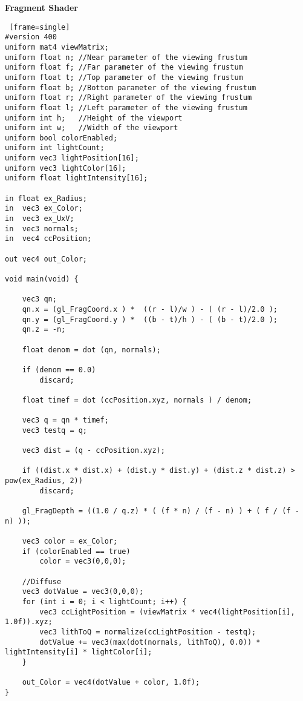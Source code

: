 \textbf{Fragment Shader}
\begin{lstlisting} [frame=single]
#version 400
uniform mat4 viewMatrix;
uniform float n; //Near parameter of the viewing frustum
uniform float f; //Far parameter of the viewing frustum
uniform float t; //Top parameter of the viewing frustum
uniform float b; //Bottom parameter of the viewing frustum
uniform float r; //Right parameter of the viewing frustum
uniform float l; //Left parameter of the viewing frustum
uniform int h; 	 //Height of the viewport
uniform int w; 	 //Width of the viewport
uniform bool colorEnabled;
uniform int lightCount;
uniform vec3 lightPosition[16];
uniform vec3 lightColor[16];
uniform float lightIntensity[16];

in float ex_Radius;
in  vec3 ex_Color;
in 	vec3 ex_UxV;
in  vec3 normals;
in 	vec4 ccPosition;

out vec4 out_Color;

void main(void) {

	vec3 qn;
	qn.x = (gl_FragCoord.x ) *  ((r - l)/w ) - ( (r - l)/2.0 );
	qn.y = (gl_FragCoord.y ) *  ((b - t)/h ) - ( (b - t)/2.0 );
	qn.z = -n;

	float denom = dot (qn, normals);

	if (denom == 0.0)
		discard;

	float timef = dot (ccPosition.xyz, normals ) / denom;

	vec3 q = qn * timef;
	vec3 testq = q;
	
	vec3 dist = (q - ccPosition.xyz);

	if ((dist.x * dist.x) + (dist.y * dist.y) + (dist.z * dist.z) > pow(ex_Radius, 2))
		discard;

	gl_FragDepth = ((1.0 / q.z) * ( (f * n) / (f - n) ) + ( f / (f - n) ));

	vec3 color = ex_Color;
	if (colorEnabled == true)
		color = vec3(0,0,0);

	//Diffuse
	vec3 dotValue = vec3(0,0,0);
	for (int i = 0; i < lightCount; i++) {
		vec3 ccLightPosition = (viewMatrix * vec4(lightPosition[i], 1.0f)).xyz;
		vec3 lithToQ = normalize(ccLightPosition - testq);
		dotValue += vec3(max(dot(normals, lithToQ), 0.0)) * lightIntensity[i] * lightColor[i];
	}

	out_Color = vec4(dotValue + color, 1.0f);
}
\end{lstlisting}